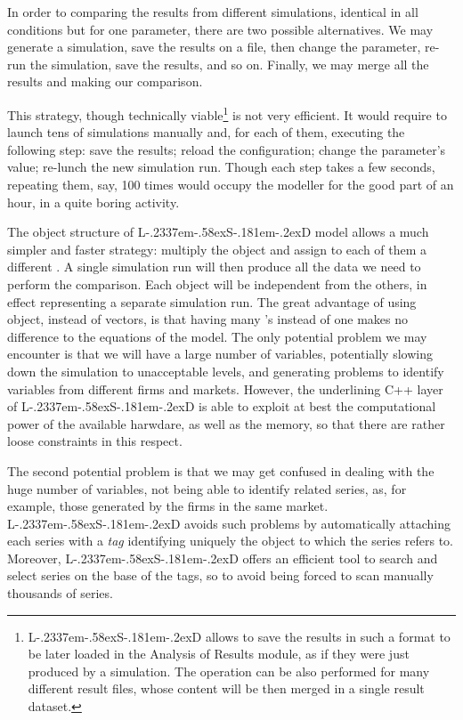 \documentclass [11pt,a4paper] {book}
\def\LsD{{L\kern-.2337em\lower-.58ex\hbox{S}\kern-.181em\lower-.2ex\hbox{D}}\xspace}
\begin{document}
In order to comparing the results from different simulations, identical in all conditions but for one parameter, there are two possible alternatives. We may generate a simulation, save the results on a file, then change the parameter, re-run the simulation, save the results, and so on. Finally, we may merge all the results and making our comparison. 

This strategy, though technically viable\footnote{\LsD allows to save the results in such a format to be later loaded in the Analysis of Results module, as if they were just produced by a simulation. The operation can be also performed for many different result files, whose content will be then merged in a single result dataset.} is not very efficient. It would require to launch tens of simulations manually and, for each of them, executing the following step: save the results; reload the configuration; change the parameter's value; re-lunch the new simulation run. Though each step takes a few seconds, repeating them, say, 100 times would occupy the modeller for the good part of an hour, in a quite boring activity.

The object structure of \LsD model allows a much simpler and faster strategy: multiply the object  and assign to each of them a different . A single simulation run will then produce all the data we need to perform the comparison. Each object  will be independent from the others, in effect representing a separate simulation run. The great advantage of using object, instead of vectors, is that having many 's instead of one makes no difference to the equations of the model. The only potential problem we may encounter is that we will have a large number of variables, potentially slowing down the simulation to unacceptable levels, and generating problems to identify variables from different firms and markets. However, the underlining C++ layer of \LsD is able to exploit at best the computational power of the available harwdare, as well as the memory, so that there are rather loose constraints in this respect.

The second potential problem is that we may get confused in dealing with the huge number of variables, not being able to identify related series, as, for example, those generated by the firms in the same market. \LsD avoids such problems by automatically attaching each series with a \textit{tag} identifying uniquely the object to which the series refers to. Moreover, \LsD offers an efficient tool to search and select series on the base of the tags, so to avoid being forced to scan manually thousands of series.
\end{document}
